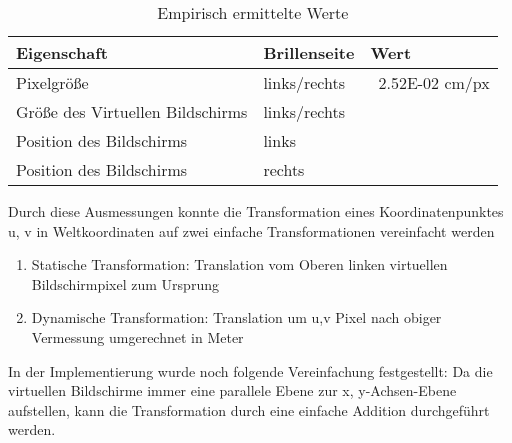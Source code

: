  \begin{table}[h]
 \begin{tabular}{l|l|l}
  Eigenschaft & Brillenseite & Wert \\
  \hline
  \hline
  Pixelgröße & links/rechts & ~2.52E-02 cm/px \\
  Größe des Virtuellen Bildschirms & links/rechts &  \\
  Position des Bildschirms & links & \\
  Position des Bildschirms & rechts & \\
 \end{tabular}
 \label{tab:konstanteWerte}
 \caption{Empirisch ermittelte Werte}
 \end{table}
Durch diese Ausmessungen konnte die  Transformation eines Koordinatenpunktes u, v in Weltkoordinaten auf zwei einfache Transformationen vereinfacht werden

   \begin{enumerate}
      \item Statische Transformation: Translation vom Oberen linken virtuellen Bildschirmpixel zum Ursprung
      \item Dynamische Transformation: Translation um u,v Pixel nach obiger Vermessung umgerechnet in Meter
   \end{enumerate}


In der Implementierung wurde noch folgende Vereinfachung festgestellt: Da die virtuellen Bildschirme immer eine parallele Ebene zur x, y-Achsen-Ebene aufstellen, kann die Transformation durch eine einfache Addition durchgeführt werden.

